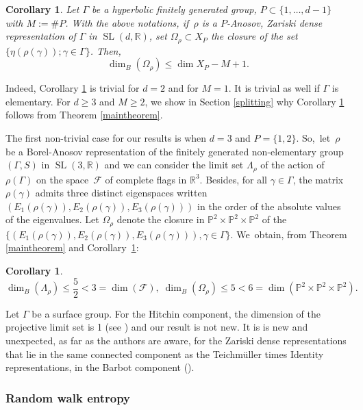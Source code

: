 \documentclass[JEP,XML,SOM,Unicode,NoEqCountersInSection,published]{cedram}
\newtheorem{corollary}[theorem]{Corollary}
\newcommand{\R}{\mathbb{R}}
\newcommand{\PP}{\mathbb{P}}
\newcommand{\F}{\mathcal{F}}
\let\G\Gamma
\let\g\gamma
\let\Om\Omega
\let\x\times
\DeclareMathOperator{\SL}{SL}
\begin{document}
\begin{corollary}\label{eigenvectors} Let \(\G\) be a hyperbolic finitely generated group, \hbox{\(P \!\subset\! \lbrace 1,\ldots, d-1 \rbrace\)} with \(M:= \# P \).
With the above notations, if~\(\rho \) is a \(P\)-Anosov, Zariski dense representation of \(\G\) in \(\SL(d,\R) \), set \(\Om_\rho \subset X_P \) the closure of the set \(\{ \eta (\rho (\g)); \g \in \G\}\). Then,
\[
\dim_B(\Om_\rho) \le \dim X_P -M +1.
\]
\end{corollary}

Indeed, Corollary \ref{eigenvectors} is trivial for \(d= 2\) and for \(M=1\). It is trivial as well if \(\G\) is elementary. For \(d \ge 3\) and \(M\ge 2\), we show in Section \ref{splitting} why Corollary \ref{eigenvectors} follows from Theorem \ref{maintheorem}.

The first non-trivial case for our results is when \(d=3\) and \(P= \{1,2\}\). So,~let~\(\rho \) be a Borel-Anosov representation of the finitely generated non-elementary group \((\G, S)\) in \(\SL(3,\R) \) and we can consider the limit set \(\Lambda_\rho \) of the action of \(\rho(\G) \) on the space~\(\F\) of complete flags in \(\R^3\). Besides, for all \(\g \in \G\), the matrix \(\rho(\g)\) admits three distinct eigenspaces written \((E_1 (\rho(\g)), E_2 (\rho(\g)), E_3 (\rho(\g)))\) in the order of the absolute values of the eigenvalues. Let \(\Om_\rho \) denote the closure in \(\PP^2\x\PP^2\x\PP^2\) of the \(\{(E_1 (\rho(\g)), E_2 (\rho(\g)), E_3 (\rho(\g))), \g \in \G \} \). We~obtain, from Theorem \ref{maintheorem} and Corollary~\ref{eigenvectors}:

\skpt
\begin{corollary}\label{2.5, 5}\mbox{}\vspace*{-\baselineskip}
\[
\dim_B(\Lambda_\rho) \le \frac{5}{2} < 3 = \dim(\F), \; \dim_B(\Om_\rho) \le 5 < 6 = \dim (\PP^2\x\PP^2\x\PP^2).
\]
\end{corollary}
Let \(\G\) be a surface group. For the Hitchin component, the dimension of the projective limit set is 1 (see \cite{Lab06}) and our result is not new. It is is new and unexpected, as far as the authors are aware, for the Zariski dense representations that lie in the same connected component as the Teichmüller times Identity representations, \ie in the Barbot component (\cf \cite{barbot}).


\subsubsection{Random walk entropy}
\end{document}
